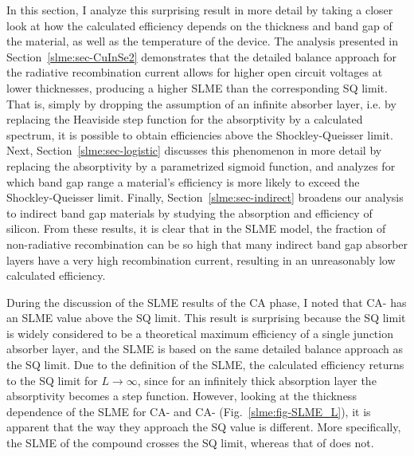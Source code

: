 \begin{refsection}
In this 
section, I analyze this surprising result in more detail by taking a closer 
look at how the calculated efficiency depends on the thickness and band gap of 
the material, as well as the temperature of the device. The analysis presented in Section~\ref{slme:sec-CuInSe2} demonstrates that the 
detailed balance approach for the radiative recombination current allows for 
higher open circuit voltages at lower thicknesses, producing a higher SLME 
than the corresponding SQ limit. That is, simply by dropping the assumption of 
an infinite absorber layer, i.e. by replacing the Heaviside step function for 
the absorptivity by a calculated spectrum, it is possible to obtain efficiencies above the 
Shockley-Queisser limit. Next, Section~\ref{slme:sec-logistic} discusses this 
phenomenon in more detail by 
replacing the absorptivity by a parametrized sigmoid function, and analyzes for 
which band gap range a material's efficiency is more likely to exceed the 
Shockley-Queisser limit. Finally, Section~\ref{slme:sec-indirect} broadens our analysis to indirect band gap 
materials by studying the absorption and efficiency of silicon. From these results, it is clear that 
in the SLME model, the fraction of non-radiative recombination can be so high that 
many indirect band gap absorber layers have a very high recombination 
current, resulting in an unreasonably low calculated efficiency.  
 
 
During the discussion of the SLME results of the CA phase, I noted that 
\mbox{CA-} has an SLME value above the SQ limit. This result is 
surprising because the SQ limit is widely considered to be a theoretical 
maximum efficiency of a single junction absorber layer, and the SLME is based 
on the same detailed balance approach as the SQ limit. Due to the definition 
of the SLME, the calculated efficiency returns to the SQ limit for \mbox{$L 
\rightarrow \infty$}, since for an infinitely thick absorption layer the 
absorptivity becomes a step function. However, looking at the thickness 
dependence of the SLME for \mbox{CA-} and \mbox{CA-} 
(Fig.~\ref{slme:fig-SLME_L}), it is apparent that the way they approach the SQ value 
is different. More specifically, the SLME of the compound  crosses 
the SQ limit, whereas that of  does not. 
 

\end{refsection}
